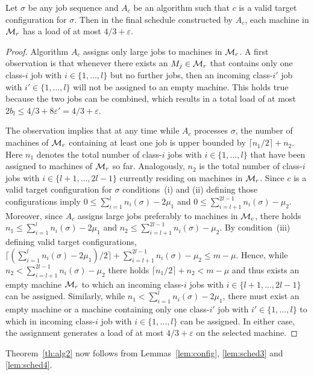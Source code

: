 \documentclass{llncs}
\newcommand{\eps}{\varepsilon}
\begin{document}
\begin{lemma}\label{lem:sched4}
Let $\sigma$ be any job sequence and $A_c$ be an algorithm such that $c$ is a valid target configuration for
$\sigma$. Then in the final schedule constructed by $A_c$, each machine in ${\cal M}_r$ has a load of at
most $4/3 +\eps$. 
\end{lemma}
\begin{proof}
Algorithm $A_c$ assigns only large jobs to machines in ${\cal M}_r$. A first observation is that whenever there
exists an $M_j \in {\cal M}_r$ that contains only one class-$i$ job with $i\in \{1,\ldots, l\}$ but no further
jobs, then an incoming class-$i'$ job with $i'\in \{1,\ldots, l\}$ will not be assigned to an empty machine.
This holds true because the two jobs can be combined, which results in a total load of at most $2b_l \leq 4/3+8\eps'
=4/3+\eps$.

The observation implies that at any time while $A_c$ processes $\sigma$, the number of machines of ${\cal M}_r$
containing at least one job is upper bounded by $\lceil n_1/2\rceil +n_2$. Here $n_1$ denotes the total
number of class-$i$ jobs with $i\in \{1,\ldots, l\}$ that have been assigned to machines of ${\cal M}_r$ so far.
Analogously, $n_2$ is the total number of class-$i$ jobs with $i\in \{l+1,\ldots, 2l-1\}$ currently residing
on machines in ${\cal M}_r$. Since $c$ is a valid target configuration for $\sigma$ conditions~(i) and (ii)
defining those configurations imply $0\leq \sum_{i=1}^l n_i(\sigma) -2\mu_1$ and 
$0\leq \sum_{i=l+1}^{2l-1} n_i(\sigma) -\mu_2$. Moreover, since $A_c$ assigns large jobs preferably to machines 
in ${\cal M}_c$, there holds $n_1 \leq  \sum_{i=1}^l n_i(\sigma) -2\mu_1$ and  
$n_2 \leq \sum_{i=l+1}^{2l-1} n_i(\sigma) -\mu_2$. By condition~(iii) defining valid target configurations,
$\lceil (\sum_{i=1}^l n_i(\sigma) -2\mu_1) / 2 \rceil + \sum_{i=l+1}^{2l-1} n_i(\sigma) - \mu_2 \leq m-\mu$.
Hence, while $n_2 < \sum_{i=l+1}^{2l-1} n_i(\sigma) -\mu_2$ there holds $\lceil n_1/2\rceil +n_2 < m-\mu$
and thus exists an empty machine ${\cal M}_r$
to which an incoming class-$i$ jobs with $i\in \{l+1,\ldots, 2l-1\}$ can be assigned. Similarly, while 
$n_1 < \sum_{i=1}^l n_i(\sigma) -2\mu_1$, there must exist an empty machine or a machine containing only
one class-$i'$ job with $i'\in \{1,\ldots, l\}$ to which in incoming class-$i$ job with $i\in \{1,\ldots, l\}$
can be assigned. In either case, the assignment generates a load of at most $4/3+\eps$ on the selected 
machine. \hspace*{\fill}{$\Box$}
\end{proof}
Theorem~\ref{th:alg2} now follows from Lemmas~\ref{lem:config}, \ref{lem:sched3} and \ref{lem:sched4}.
\end{document}
